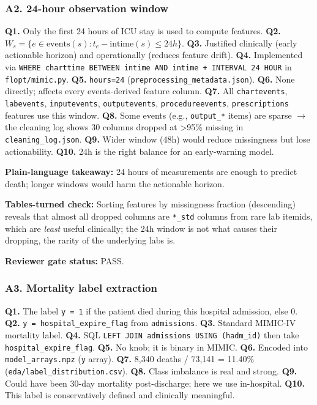 \documentclass{article}
\begin{document}
\subsubsection{A2. 24-hour observation window}


\textbf{Q1.} Only the first 24 hours of ICU stay is used to compute features. \textbf{Q2.} \(W_s = \{e \in \text{events}(s) : t_e - \text{intime}(s) \le 24h\}\). \textbf{Q3.} Justified clinically (early actionable horizon) and operationally (reduces feature drift). \textbf{Q4.} Implemented via \texttt{WHERE charttime BETWEEN intime AND intime + INTERVAL 24 HOUR} in \texttt{flopt/mimic.py}. \textbf{Q5.} \texttt{hours=24} (\texttt{preprocessing\_metadata.json}). \textbf{Q6.} None directly; affects every events-derived feature column. \textbf{Q7.} All \texttt{chartevents}, \texttt{labevents}, \texttt{inputevents}, \texttt{outputevents}, \texttt{procedureevents}, \texttt{prescriptions} features use this window. \textbf{Q8.} Some events (e.g., \texttt{output\_*} items) are sparse \ensuremath{\rightarrow} the cleaning log shows 30 columns dropped at >95\% missing in \texttt{cleaning\_log.json}. \textbf{Q9.} Wider window (48h) would reduce missingness but lose actionability. \textbf{Q10.} 24h is the right balance for an early-warning model.


\textbf{Plain-language takeaway:} 24 hours of measurements are enough to predict death; longer windows would harm the actionable horizon.


\textbf{Tables-turned check:} Sorting features by missingness fraction (descending) reveals that almost all dropped columns are \texttt{*\_std} columns from rare lab itemids, which are \emph{least} useful clinically; the 24h window is not what causes their dropping, the rarity of the underlying labs is.


\textbf{Reviewer gate status:} PASS.


\subsubsection{A3. Mortality label extraction}


\textbf{Q1.} The label \texttt{y = 1} if the patient died during this hospital admission, else 0. \textbf{Q2.} \texttt{y = hospital\_expire\_flag} from \texttt{admissions}. \textbf{Q3.} Standard MIMIC-IV mortality label. \textbf{Q4.} SQL \texttt{LEFT JOIN admissions USING (hadm\_id)} then take \texttt{hospital\_expire\_flag}. \textbf{Q5.} No knob; it is binary in MIMIC. \textbf{Q6.} Encoded into \texttt{model\_arrays.npz} (\texttt{y} array). \textbf{Q7.} 8,340 deaths / 73,141 = 11.40\% (\texttt{eda/label\_distribution.csv}). \textbf{Q8.} Class imbalance is real and strong. \textbf{Q9.} Could have been 30-day mortality post-discharge; here we use in-hospital. \textbf{Q10.} This label is conservatively defined and clinically meaningful.
\end{document}
